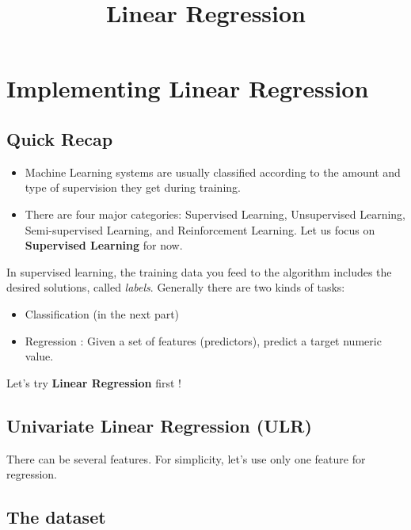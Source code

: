 \documentclass[11pt]{article}
\title{Linear Regression}
\providecommand{\tightlist}{%
      \setlength{\itemsep}{0pt}\setlength{\parskip}{0pt}}
\begin{document}
    
    
    \maketitle
    
    

    
    \section{Implementing Linear
Regression}\label{implementing-linear-regression}

    \subsection{Quick Recap}\label{quick-recap}

\begin{itemize}
\tightlist
\item
  Machine Learning systems are usually classified according to the
  amount and type of supervision they get during training.
\item
  There are four major categories: Supervised Learning, Unsupervised
  Learning, Semi-supervised Learning, and Reinforcement Learning. Let us
  focus on \textbf{Supervised Learning} for now.
\end{itemize}

    In supervised learning, the training data you feed to the algorithm
includes the desired solutions, called \emph{labels}. Generally there
are two kinds of tasks:

\begin{itemize}
\tightlist
\item
  Classification (in the next part)
\item
  Regression : Given a set of features (predictors), predict a target
  numeric value.
\end{itemize}

Let's try \textbf{Linear Regression} first !

    \subsection{Univariate Linear Regression
(ULR)}\label{univariate-linear-regression-ulr}

There can be several features. For simplicity, let's use only one
feature for regression.

    \subsection{The dataset}\label{the-dataset}
\end{document}
